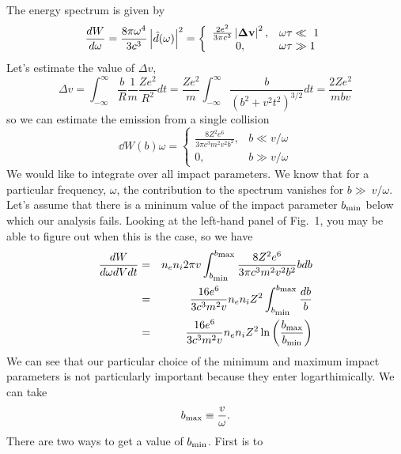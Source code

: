 The energy spectrum is given by
\begin{equation}
\frac{d {W}}{d {\omega}} = \frac{8\pi \omega^4}{3c^3} \left | \hat{d}(\omega)
\right |^2 = 
\left \{
\begin{array}{cl}
\frac{2 e^2}{3\pi c^3} \left | {\bf \Delta v} \right |^2, &\omega \tau \ll\ 1 \\
 0, & \omega\tau \gg 1
\end{array}
\right .
\label{eq:330}
\end{equation}
Let's estimate the value of $\Delta v$,
\begin{equation}
\Delta v =  \int_{-\infty}^\infty \frac{b}{R}
\frac{1}{m} \frac{Ze^2}{R^2} dt = \frac{Z e^2}{m} 
\int_{-\infty}^\infty \frac{b}{\left ( b^2 + v^2 t^2 \right )^{3/2}} dt
= \frac{2 Z e^2}{m b v}
\label{eq:331}
\end{equation}
so we can estimate the emission from a single collision 
\begin{equation}
\dd{W(b)}{\omega} = 
\left \{
\begin{array}{cl}
\frac{8 Z^2 e^6}{3\pi c^3 m^2 v^2 b^2}, & b \ll v/\omega \\
 0, & b \gg v/\omega
\end{array}
\right .
\label{eq:332}
\end{equation}
We would like to integrate over all impact parameters.  We know that
for a particular frequency, $\omega$, the contribution to the spectrum
vanishes for $b \gg\ v/\omega$.   Let's assume that
there is a mininum value of the impact parameter $b_{\hbox{\rm \scriptsize min}}$ below
which our analysis fails.  Looking at the left-hand panel of Fig.~1,
you may be able to figure out when this is the case, so we 
have
\begin{eqnarray}
\frac{d W}{d\omega dV dt} &=& n_e n_i 2\pi v \int_{b_{\hbox{\rm \scriptsize min}}}^{b_{\hbox{\rm \scriptsize max}}}
\frac{8 Z^2 e^6}{3\pi c^3 m^2 v^2 b^2} b d b
 \\ 
&=& \frac{16 e^6}{3 c^3 m^2 v} n_e n_i Z^2
\int_{b_{\hbox{\rm \scriptsize min}}}^{b_{\hbox{\rm \scriptsize max}}} \frac{db}{b}\\
&=&
\frac{16 e^6}{3 c^3 m^2 v} n_e n_i Z^2 \ln \left
(\frac{b_{\hbox{\rm \scriptsize max}}}{b_{\hbox{\rm \scriptsize min}}} \right )
\label{eq:333}
\end{eqnarray}
We can see that our particular choice of the minimum and maximum
impact parameters is not particularly important because they enter
logarthimically.  We can take
\begin{equation}
b_{\hbox{\rm \scriptsize max}} \equiv \frac{v}{\omega}.
\end{equation}
There are two ways to get a value of $b_{\hbox{\rm \scriptsize min}}$.  First is to

